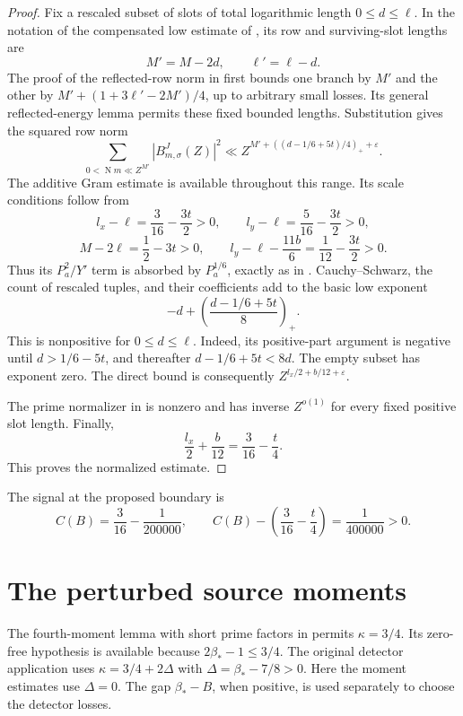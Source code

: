 \documentclass[11pt]{article}
\newcommand{\NF}{\operatorname{N}}
\begin{document}
\begin{proof}
Fix a rescaled subset of slots of total logarithmic length
$0\le d\le\ell$. In the notation of the compensated low estimate of
\cite{OAI}, its row and surviving-slot lengths are
\[
 M'=M-2d,\qquad \ell'=\ell-d.
\]
The proof of the reflected-row norm in \cite[Part II, compensated low estimate]{OAI}
first bounds one branch by $M'$ and the other by
$M'+(1+3\ell'-2M')/4$, up to arbitrary small losses. Its general
reflected-energy lemma permits these fixed bounded lengths. Substitution
gives the squared row norm
\begin{equation}\label{eq:row}
 \sum_{0<\NF m\ll Z^{M'}} |B^J_{m,\sigma}(Z)|^2
 \ll Z^{M'+((d-1/6+5t)/4)_++\varepsilon}.
\end{equation}
The additive Gram estimate is available throughout this range. Its scale
conditions follow from
\[
 l_x-\ell=\frac3{16}-\frac{3t}{2}>0,\qquad
 l_y-\ell=\frac5{16}-\frac{3t}{2}>0,
\]
\[
 M-2\ell=\frac12-3t>0,\qquad
 l_y-\ell-\frac{11b}{6}=\frac1{12}-\frac{3t}{2}>0.
\]
Thus its $P_a^2/Y'$ term is absorbed by $P_a^{1/6}$, exactly as in
\cite[Part II, additive Gram bound]{OAI}. Cauchy--Schwarz, the count of
rescaled tuples, and their coefficients add to the basic low exponent
\[
 -d+\left(\frac{d-1/6+5t}{8}\right)_+.
\]
This is nonpositive for $0\le d\le\ell$. Indeed, its positive-part
argument is negative until $d>1/6-5t$, and thereafter
$d-1/6+5t<8d$. The empty subset has exponent zero. The direct bound
is consequently $Z^{l_x/2+b/12+\varepsilon}$.

The prime normalizer in \cite[Part II, principal normalizer]{OAI} is nonzero and has
inverse $Z^{o(1)}$ for every fixed positive slot length. Finally,
\[
 \frac{l_x}{2}+\frac b{12}=\frac3{16}-\frac t4.
\]
This proves the normalized estimate.
\end{proof}

The signal at the proposed boundary is
\begin{equation}\label{eq:low-gap}
 C(B)=\frac3{16}-\frac1{200000},\qquad
 C(B)-\left(\frac3{16}-\frac t4\right)
 =\frac1{400000}>0.
\end{equation}

\section{The perturbed source moments}\label{sec:moments}

The fourth-moment lemma with short prime factors in \cite{OAI} permits
$\kappa=3/4$. Its zero-free hypothesis is available because
$2\beta_*-1\le3/4$. The original detector application uses
$\kappa=3/4+2\Delta$ with $\Delta=\beta_*-7/8>0$.
Here the moment estimates use $\Delta=0$. The gap $\beta_*-B$, when
positive, is used separately to choose the detector losses.
\end{document}
